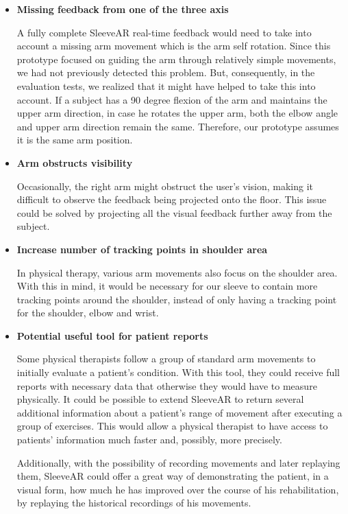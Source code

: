 \begin{itemize}
\item \textbf{Missing feedback from one of the three axis}

A fully complete SleeveAR real-time feedback would need to take into account a missing arm movement which is the arm self rotation. Since this prototype focused on guiding the arm through relatively simple movements, we had not previously detected this problem. But, consequently, in the evaluation tests, we realized that it might have helped to take this into account. If a subject has a 90 degree flexion of the arm and maintains the upper arm direction, in case he rotates the upper arm, both the elbow angle and upper arm direction remain the same. Therefore, our prototype assumes it is the same arm position.

\item \textbf{Arm obstructs visibility}

Occasionally, the right arm might obstruct the user's vision, making it difficult to observe the feedback being projected onto the floor. This issue could be solved by projecting all the visual feedback further away from the subject.

\item \textbf{Increase number of tracking points in shoulder area}

In physical therapy, various arm movements also focus on the shoulder area. With this in mind, it would be necessary for our sleeve to contain more tracking points around the shoulder, instead of only having a tracking point for the shoulder, elbow and wrist.

\item \textbf{Potential useful tool for patient reports}

Some physical therapists follow a group of standard arm movements to initially evaluate a patient's condition. With this tool, they could receive full reports with necessary data that otherwise they would have to measure physically. It could be possible to extend SleeveAR to return several additional information about a patient's range of movement after executing a group of exercises. This would allow a physical therapist to have access to patients' information much faster and, possibly, more precisely. 

Additionally, with the possibility of recording movements and later replaying them, SleeveAR could offer a great way of demonstrating the patient, in a visual form, how much he has improved over the course of his rehabilitation, by replaying the historical recordings of his movements.


\end{itemize}
